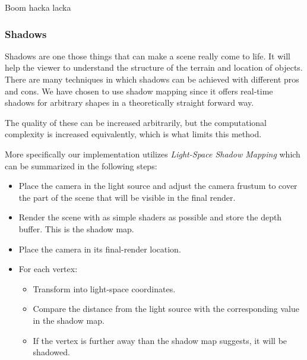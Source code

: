 Boom hacka lacka

\subsubsection{Shadows}
Shadows are one those things that can make a scene really come to life. It will help the viewer to understand the structure of the terrain and location of objects. There are many techniques in which shadows can be achieved with different pros and cons. We have chosen to use shadow mapping since it offers real-time shadows for arbitrary shapes in a theoretically straight forward way. 

The quality of these can be increased arbitrarily, but the computational complexity is increased equivalently, which is what limits this method. 

More specifically our implementation utilizes \textit{Light-Space Shadow Mapping} which can be summarized in the following steps:

\begin{itemize}
\item Place the camera in the light source and adjust the camera frustum to cover the part of the scene that will be visible in the final render.
\item Render the scene with as simple shaders as possible and store the depth buffer. This is the shadow map.
\item Place the camera in its final-render location.
\item For each vertex:
\begin{itemize}
\item Transform into light-space coordinates.
\item Compare the distance from the light source with the corresponding value in the shadow map.
\item If the vertex is further away than the shadow map suggests, it will be shadowed. 
\end{itemize}
\end{itemize}

